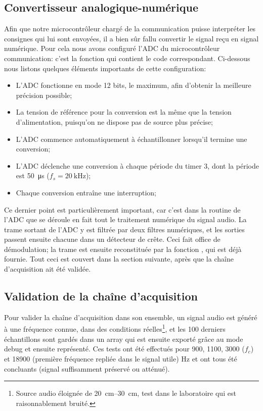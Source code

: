 \subsection{Convertisseur analogique-numérique}
Afin que notre microcontrôleur chargé de la communication puisse interpréter les consignes qui lui sont envoyées, il a bien sûr fallu convertir le signal reçu en signal numérique. Pour cela nous avons configuré l'ADC du microcontrôleur communication: c'est la fonction  qui contient le code correspondant. Ci-dessous nous listons quelques éléments importants de cette configuration:
\begin{itemize}
\item L'ADC fonctionne en mode 12 bits, le maximum, afin d'obtenir la meilleure précision possible;
\item La tension de référence pour la conversion est la même que la tension d'alimentation, puisqu'on ne dispose pas de source plus précise;
\item L'ADC commence automatiquement à échantillonner lorsqu'il termine une conversion;
\item L'ADC déclenche une conversion à chaque période du timer 3, dont la période est \SI{50}{\micro\second} ($f_s = \SI{20}{\kilo\hertz}$);
\item Chaque conversion entraîne une interruption;
\end{itemize}

Ce dernier point est particulièrement important, car c'est dans la routine de l'ADC que se déroule en fait tout le traitement numérique du signal audio. La trame sortant de l'ADC y est filtrée par deux filtres numériques, et les sorties passent ensuite chacune dans un détecteur de crête. Ceci fait office de démodulation; la trame est ensuite reconstituée par la fonction , qui est déjà fournie. Tout ceci est couvert dans la section suivante, après que la chaîne d'acquisition ait été validée.

\subsection{Validation de la chaîne d'acquisition}

Pour valider la chaîne d'acquisition dans son ensemble, un signal audio est généré à une fréquence connue, dans des conditions réelles\footnote{Source audio éloignée de \SIrange{20}{30}{\centi\meter}, test dans le laboratoire qui est raisonnablement bruité.}, et les 100 derniers échantillons sont gardés dans un array qui est ensuite exporté grâce au mode debug et ensuite représenté. Ces tests ont été effectués pour 900, 1100, 3000 ($f_c$) et 18900 (première fréquence repliée dans le signal utile) \si{\hertz} et ont tous été concluants (signal suffisamment préservé ou atténué).


